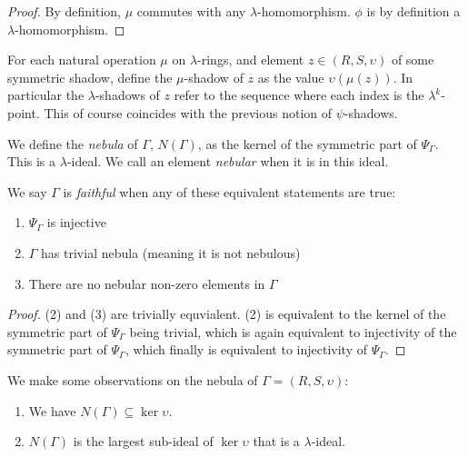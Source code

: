 \begin{proof}
  By definition, $\mu$ commutes with any $\lambda$-homomorphism. $\phi$ is by definition a $\lambda$-homomorphism. \qedhere
\end{proof}

\begin{definition}
  For each natural operation $\mu$ on $\lambda$-rings, and element $z \in (R, S, \upsilon)$ of some symmetric shadow, define the $\mu$-shadow of $z$ as the value $\upsilon(\mu(z))$. In particular the $\lambda$-shadows of $z$ refer to the sequence where each index is the $\lambda^k$-point. This of course coincides with the previous notion of $\psi$-shadows.
\end{definition}

\begin{definition}
  We define the \emph{nebula} of $\Gamma$, $N(\Gamma)$, as the kernel of the symmetric part of $\Psi_\Gamma$. This is a $\lambda$-ideal. We call an element \emph{nebular} when it is in this ideal.
\end{definition}

\begin{propdef}
  We say $\Gamma$ is \emph{faithful} when any of these equivalent statements are true:
  \begin{enumerate}
    \item $\Psi_\Gamma$ is injective
    \item $\Gamma$ has trivial nebula (meaning it is not nebulous)
    \item There are no nebular non-zero elements in $\Gamma$
  \end{enumerate}
\end{propdef}

\begin{proof}
  (2) and (3) are trivially equvialent. (2) is equivalent to the kernel of the symmetric part of $\Psi_\Gamma$ being trivial, which is again equivalent to injectivity of the symmetric part of $\Psi_\Gamma$, which finally is equivalent to injectivity of $\Psi_\Gamma$.
\end{proof}

\begin{proposition} 
  We make some observations on the nebula of $\Gamma = (R, S, \upsilon)$:
  \begin{enumerate}
    \item We have $N(\Gamma) \subseteq \ker \upsilon$. 
    \item $N(\Gamma)$ is the largest sub-ideal of $\ker \upsilon$ that is a $\lambda$-ideal. 
  \end{enumerate}
\end{proposition}

